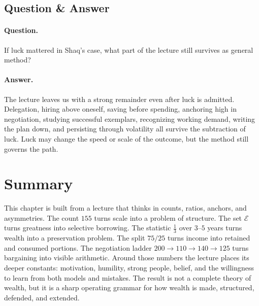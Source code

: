 \subsection{Question \& Answer}

\paragraph{Question.} If luck mattered in Shaq's case, what part of the lecture still survives as general method?

\paragraph{Answer.} The lecture leaves us with a strong remainder even after luck is admitted. Delegation, hiring above oneself, saving before spending, anchoring high in negotiation, studying successful exemplars, recognizing working demand, writing the plan down, and persisting through volatility all survive the subtraction of luck. Luck may change the speed or scale of the outcome, but the method still governs the path.

\section{Summary}

This chapter is built from a lecture that thinks in counts, ratios, anchors, and asymmetries. The count \(155\) turns scale into a problem of structure. The set \(\mathcal{E}\) turns greatness into selective borrowing. The statistic \(\frac13\) over \(3\text{--}5\) years turns wealth into a preservation problem. The split \(75/25\) turns income into retained and consumed portions. The negotiation ladder \(200 \to 110 \to 140 \to 125\) turns bargaining into visible arithmetic. Around those numbers the lecture places its deeper constants: motivation, humility, strong people, belief, and the willingness to learn from both models and mistakes. The result is not a complete theory of wealth, but it is a sharp operating grammar for how wealth is made, structured, defended, and extended.